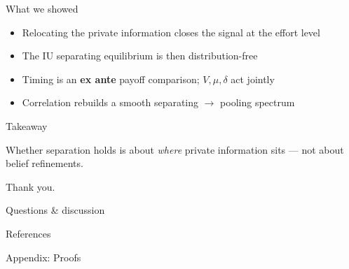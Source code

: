 \documentclass[10pt]{beamer}
\newcommand{\rIU}{\mathrm{IU}}
\begin{document}
\begin{frame}{What we showed}
  \begin{itemize}
    \item Relocating the private information closes the signal at the
          effort level
    \item The $\rIU$ separating equilibrium is then
          \alert{distribution-free}
    \item Timing is an \textbf{ex ante} payoff comparison;
          $V,\mu,\delta$ act jointly
    \item Correlation rebuilds a smooth separating $\to$ pooling
          spectrum
  \end{itemize}
\end{frame}

\begin{frame}{Takeaway}
  \begin{block}{}
    Whether separation holds is about \emph{where} private information
    sits --- not about belief refinements.
  \end{block}
\end{frame}

\begin{frame}[focus]
  Thank you.

  \vspace{0.5em}
  \small Questions \& discussion
\end{frame}

\begin{frame}[allowframebreaks]{References}
  
  {
    \renewcommand{\bibsection}{\vspace{-5pt}}
    
  }
\end{frame}

\appendix

\begin{frame}[focus]
  Appendix: Proofs
\end{frame}
\end{document}
